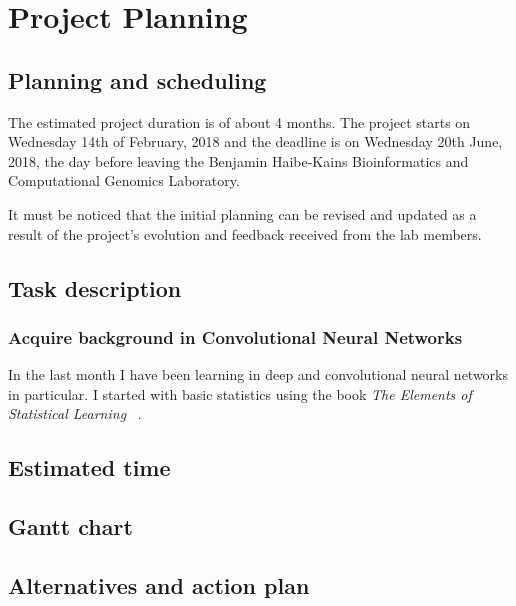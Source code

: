 

\section{Project Planning}

\subsection{Planning and scheduling}

The estimated project duration is of about 4 months. The project starts on Wednesday 14th of 
February, 2018 and the deadline is on Wednesday 20th June, 2018, the day before leaving the 
Benjamin Haibe-Kains Bioinformatics and Computational Genomics Laboratory.

It must be noticed that the initial planning can be revised and updated as a result of the 
project's evolution and feedback received from the lab members. 

\subsection{Task description}

\subsubsection{Acquire background in Convolutional Neural Networks}

In the last month I have been learning in deep and convolutional neural networks in particular. 
I started with basic statistics using the book \emph{The Elements of Statistical Learning}
~\cite{ElementsStatisticalLearning}.

\subsection{Estimated time}

\subsection{Gantt chart}

\subsection{Alternatives and action plan}
